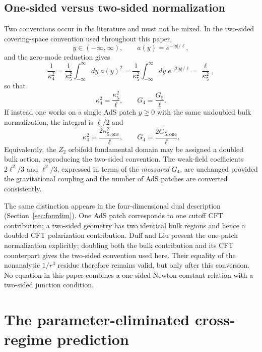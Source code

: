 \documentclass[11pt,a4paper]{article}
\theoremstyle{plain}
\theoremstyle{definition}
\newcommand{\kfive}{\kappa_5}
\newcommand{\kfour}{\kappa_4}
\begin{document}
\subsection{One-sided versus two-sided normalization}
\label{sec:normalization}

Two conventions occur in the literature and must not be mixed. In the
two-sided covering-space convention used throughout this paper,
\begin{equation}
\label{eq:twosided}
y\in(-\infty,\infty),
\qquad
a(y)=e^{-|y|/\ell},
\end{equation}
and the zero-mode reduction gives
\begin{equation}
\label{eq:kappa4}
\frac{1}{\kfour^2}
=\frac{1}{\kfive^2}\int_{-\infty}^{\infty}dy\;a(y)^2
=\frac{1}{\kfive^2}\int_{-\infty}^{\infty}dy\;e^{-2|y|/\ell}
=\frac{\ell}{\kfive^2},
\end{equation}
so that
\begin{equation}
\label{eq:G4}
\boxed{\;
\kfour^2=\frac{\kfive^2}{\ell},
\qquad
G_4=\frac{G_5}{\ell}.
\;}
\end{equation}
If instead one works on a single AdS patch $y\ge0$ with the same
undoubled bulk normalization, the integral is $\ell/2$ and
\begin{equation}
\label{eq:onesided}
\kfour^2=\frac{2\kappa_{5,\mathrm{one}}^2}{\ell},
\qquad
G_4=\frac{2G_{5,\mathrm{one}}}{\ell}.
\end{equation}
Equivalently, the $Z_2$ orbifold fundamental domain may be assigned a
doubled bulk action, reproducing the two-sided convention. The weak-field
coefficients $2\ell^2/3$ and $\ell^2/3$, expressed in terms of the
\emph{measured} $G_4$, are unchanged provided the gravitational coupling
and the number of AdS patches are converted consistently.

The same distinction appears in the four-dimensional dual description
(Section~\ref{sec:fourdim}). One AdS patch corresponds to one cutoff CFT
contribution; a two-sided geometry has two identical bulk regions and
hence a doubled CFT polarization contribution. Duff and Liu \cite{DuffLiu}
present the one-patch normalization explicitly; doubling both the bulk
contribution and its CFT counterpart gives the two-sided convention used
here. Their equality of the nonanalytic $1/r^3$ residue therefore remains
valid, but only after this conversion. No equation in this paper combines
a one-sided Newton-constant relation with a two-sided junction condition.

\section{The parameter-eliminated cross-regime prediction}
\label{sec:crossregime}
\end{document}
